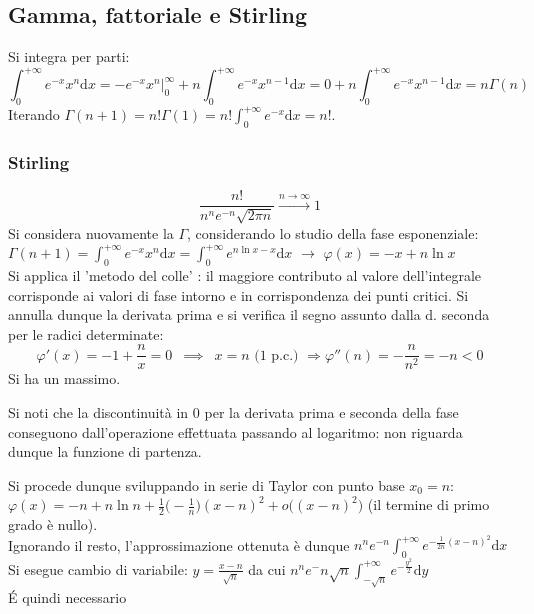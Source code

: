 \documentclass[10pt, oneside]{book}
\theoremstyle{plain}
\begin{document}
\subsection{Gamma, fattoriale e Stirling}
Si integra per parti:
\[\int_0^{+\infty} e^{-x} x^n \textrm{d}x = - e^{-x} x^n \bigg|_0^\infty + n \int_0^{+\infty} e^{-x} x^{n-1} \textrm{d}x = 0 + n \int_0^{+\infty} e^{-x} x^{n-1} \textrm{d}x = n \Gamma(n)\]
Iterando $\displaystyle \Gamma(n+1) = n! \Gamma(1) = n! \int_0^{+\infty} e^{-x} \textrm{d}x = n!$.
\subsubsection{Stirling}
\[\frac{n!}{n^n e^{-n} \sqrt{2\pi n}} \xrightarrow[]{n \rightarrow \infty} 1\]
Si considera nuovamente la $\Gamma$, considerando lo studio della fase esponenziale: $\displaystyle \Gamma(n+1) = \int_0^{+\infty} e^{-x} x^{n} \textrm{d}x = \int_0^{+\infty} e^{n \ln x - x} \textrm{d}x$ $\rightarrow$ $\varphi(x) = - x + n \ln x$
\\Si applica il 'metodo del colle' : il maggiore contributo al valore dell'integrale corrisponde ai valori di fase intorno e in corrispondenza dei punti critici. Si annulla dunque la derivata prima e si verifica il segno assunto dalla d. seconda per le radici determinate:
\[\varphi'(x) = -1 + \frac{n}{x} = 0 \enspace \implies \enspace x = n \textrm{ (1 p.c.) } \Rightarrow \varphi''(n) = - \frac{n}{n^2} = - n < 0\]
Si ha un massimo.
\begin{oss}
    Si noti che la discontinuità in $0$ per la derivata prima e seconda della fase conseguono dall'operazione effettuata passando al logaritmo: non riguarda dunque la funzione di partenza.
\end{oss}
Si procede dunque sviluppando in serie di Taylor con punto base $x_0 = n$: $\displaystyle \varphi(x) = - n + n \ln n + \frac{1}{2}\big(-\frac{1}{n}\big)(x-n)^2 + o\big((x-n)^2\big)$ (il termine di primo grado è nullo).
\\Ignorando il resto, l'approssimazione ottenuta è dunque $\displaystyle n^n e^{-n} \int_0^{+\infty} e^{\displaystyle -\frac{1}{2n}(x-n)^2}\textrm{d}x$
\\Si esegue cambio di variabile: $\displaystyle y = \frac{x-n}{\sqrt{n}}$ da cui $\displaystyle n^n e^-n \sqrt{n} \int_{-\sqrt{n}}^{+\infty} e^{\displaystyle-\frac{y^2}{2}}\textrm{d}y$
\\\'E quindi necessario
\end{document}
